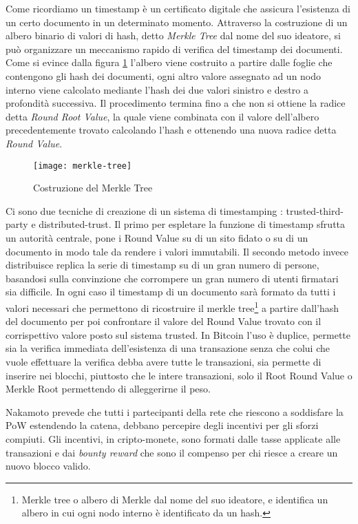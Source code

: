 	Come ricordiamo un timestamp è un certificato digitale che assicura l'esistenza di un certo documento in un determinato momento. 
	Attraverso la costruzione di un albero binario di valori di hash, detto \textit{Merkle Tree} dal nome del suo ideatore, si può organizzare un meccanismo rapido di verifica del timestamp dei documenti.
	Come si evince dalla figura \ref{fig:merkle-tree} l'albero viene costruito a partire dalle foglie che contengono gli hash dei documenti, ogni altro valore assegnato ad un nodo interno viene calcolato mediante l'hash dei due valori sinistro e destro a profondità successiva. Il procedimento termina fino a che non si ottiene la radice detta \textit{Round Root Value}, la quale viene combinata con il valore dell'albero precedentemente trovato calcolando l'hash e ottenendo una nuova radice detta \textit{Round Value}. 
			\begin{figure}
				\caption{Costruzione del Merkle Tree}
				\centering
				\texttt{[image: merkle-tree]}
				\label{fig:merkle-tree}
			\end{figure}
	Ci sono due tecniche di creazione di un sistema di timestamping : trusted-third-party e distributed-trust\cite{massias1999design}.
	Il primo per espletare la funzione di timestamp sfrutta un autorità centrale, pone i Round Value su di un sito fidato o su di un documento in modo tale da rendere i valori immutabili. Il secondo metodo invece distribuisce replica la serie di timestamp su di un gran numero di persone, basandosi sulla convinzione che corrompere un gran numero di utenti firmatari sia difficile. In ogni caso il timestamp di un documento sarà formato da tutti i valori necessari che permettono di ricostruire il merkle tree\footnote{Merkle tree o albero di Merkle dal nome del suo ideatore, e identifica un albero in cui ogni nodo interno è identificato da un hash.} a partire dall'hash del documento per poi confrontare il valore del Round Value trovato con il corrispettivo valore posto sul sistema trusted. 
	In Bitcoin l'uso è duplice, permette sia la verifica immediata dell'esistenza di una transazione senza che colui che vuole effettuare la verifica debba avere tutte le transazioni, sia permette di inserire nei blocchi, piuttosto che le intere transazioni, solo il Root Round Value o Merkle Root permettendo di alleggerirne il peso.
	
	Nakamoto prevede che tutti i partecipanti della rete che riescono a soddisfare la PoW estendendo la catena, debbano percepire degli incentivi per gli sforzi compiuti. Gli incentivi, in cripto-monete, sono formati dalle tasse applicate alle transazioni e dai \textit{bounty reward} che sono il compenso per chi riesce a creare un nuovo blocco valido. 
	

